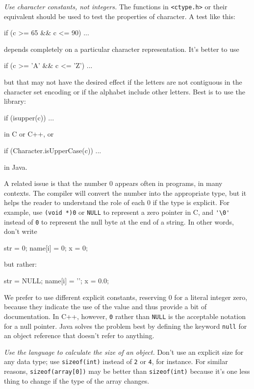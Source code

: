 \emph{Use character constants, not integers.} The functions in
\verb'<ctype.h>' or their equivalent should be used to test the properties
of character. A test like this:
\begin{badcode}
    if (c >= 65 && c <= 90)
        ...
\end{badcode}
depends completely on a particular character representation. It's better to
use
\begin{badcode}
    if (c >= 'A' && c <= 'Z')
        ...
\end{badcode}
but that may not have the desired effect if the letters are not contiguous
in the character set encoding or if the alphabet include other letters.
Best is to use the library:
\begin{wellcode}
    if (isupper(c))
        ...
\end{wellcode}
in C or C++, or 
\begin{wellcode}
    if (Character.isUpperCase(c))
        ...
\end{wellcode}
in Java.

A related issue is that the number 0 appears often in programs, in many
contexts. The compiler will convert the number into the appropriate type,
but it helps the reader to understand the role of each 0 if the type is
explicit. For example, use \verb'(void *)0' or \verb'NULL' to represent a
zero pointer in C, and \verb"'\0'" instead of \verb'0' to represent the
null byte at the end of a string. In other words, don't write 
\begin{badcode}
    str = 0;
    name[i] = 0;
    x = 0;
\end{badcode}
but rather:
\begin{wellcode}
    str = NULL;
    name[i] = '\0';
    x = 0.0;
\end{wellcode}
We prefer to use different explicit constants, reserving 0 for a literal
integer zero, because they indicate the use of the value and thus provide a
bit of documentation. In C++, however, \verb'0' rather than \verb'NULL' is
the acceptable notation for a null pointer. Java solves the problem best by
defining the keyword \verb'null' for an object reference that doesn't refer
to anything.

\emph{Use the language to calculate the size of an object.} Don't use an
explicit size for any data type; use \verb'sizeof(int)' instead of \verb'2'
or \verb'4', for instance. For similar reasons, \verb'sizeof(array[0])' may
be better than \verb'sizeof(int)' because it's one less thing to change if
the type of the array changes.

